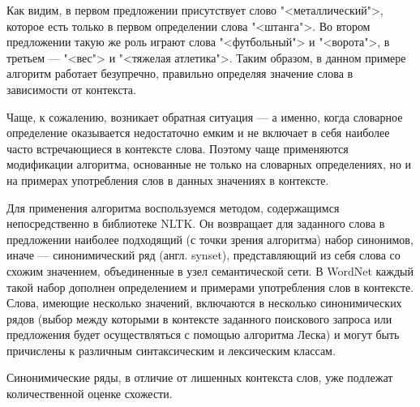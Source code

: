 Как видим, в первом предложении присутствует слово "<металлический">, которое есть только в первом определении слова "<штанга">.
Во втором предложении такую же роль играют слова "<футбольный"> и "<ворота">, в третьем --- "<вес"> и "<тяжелая атлетика">.
Таким образом, в данном примере алгоритм работает безупречно, правильно определяя значение слова в зависимости от контекста.

Чаще, к сожалению, возникает обратная ситуация --- а именно, когда словарное определение оказывается недостаточно емким и не включает
в себя наиболее часто встречающиеся в контексте слова. Поэтому чаще применяются модификации алгоритма, основанные не только на
словарных определениях, но и на примерах употребления слов в данных значениях в контексте.

Для применения алгоритма воспользуемся методом, содержащимся непосредственно в библиотеке NLTK. Он возвращает для заданного слова
в предложении наиболее подходящий (с точки зрения алгоритма) набор синонимов, иначе --- синонимический ряд (англ. synset), 
представляющий из себя слова со схожим значением, объединенные в узел семантической сети. В WordNet каждый такой набор дополнен
определением и примерами употребления слов в контексте. Слова, имеющие несколько значений, включаются в несколько синонимических рядов
(выбор между которыми в контексте заданного поискового запроса или предложения будет осуществляться с помощью алгоритма Леска)
и могут быть причислены к различным синтаксическим и лексическим классам.

Синонимические ряды, в отличие от лишенных контекста слов, уже подлежат количественной оценке схожести.